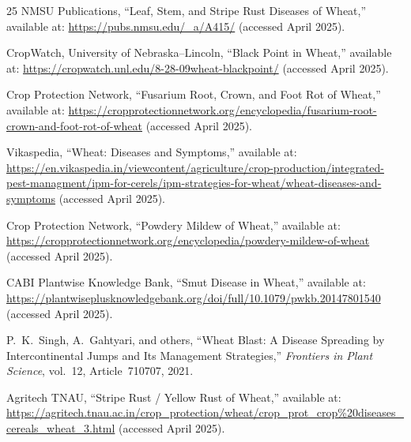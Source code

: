 \documentclass[12pt,a4paper]{report}
\begin{document}
\begin{thebibliography}{25}
NMSU Publications,
``Leaf, Stem, and Stripe Rust Diseases of Wheat,''
available at: \url{https://pubs.nmsu.edu/_a/A415/}
(accessed April 2025).

CropWatch, University of Nebraska--Lincoln,
``Black Point in Wheat,''
available at: \url{https://cropwatch.unl.edu/8-28-09wheat-blackpoint/}
(accessed April 2025).

Crop Protection Network,
``Fusarium Root, Crown, and Foot Rot of Wheat,''
available at: \url{https://cropprotectionnetwork.org/encyclopedia/fusarium-root-crown-and-foot-rot-of-wheat}
(accessed April 2025).

Vikaspedia,
``Wheat: Diseases and Symptoms,''
available at: \url{https://en.vikaspedia.in/viewcontent/agriculture/crop-production/integrated-pest-managment/ipm-for-cerels/ipm-strategies-for-wheat/wheat-diseases-and-symptoms}
(accessed April 2025).

Crop Protection Network,
``Powdery Mildew of Wheat,''
available at: \url{https://cropprotectionnetwork.org/encyclopedia/powdery-mildew-of-wheat}
(accessed April 2025).

CABI Plantwise Knowledge Bank,
``Smut Disease in Wheat,''
available at: \url{https://plantwiseplusknowledgebank.org/doi/full/10.1079/pwkb.20147801540}
(accessed April 2025).

P.~K.~Singh, A.~Gahtyari, and others,
``Wheat Blast: A Disease Spreading by Intercontinental Jumps and Its Management Strategies,''
\textit{Frontiers in Plant Science}, vol.~12, Article~710707, 2021.

Agritech TNAU,
``Stripe Rust / Yellow Rust of Wheat,''
available at: \url{https://agritech.tnau.ac.in/crop_protection/wheat/crop_prot_crop\%20diseases_cereals_wheat_3.html}
(accessed April 2025).

\end{thebibliography}
\end{document}
